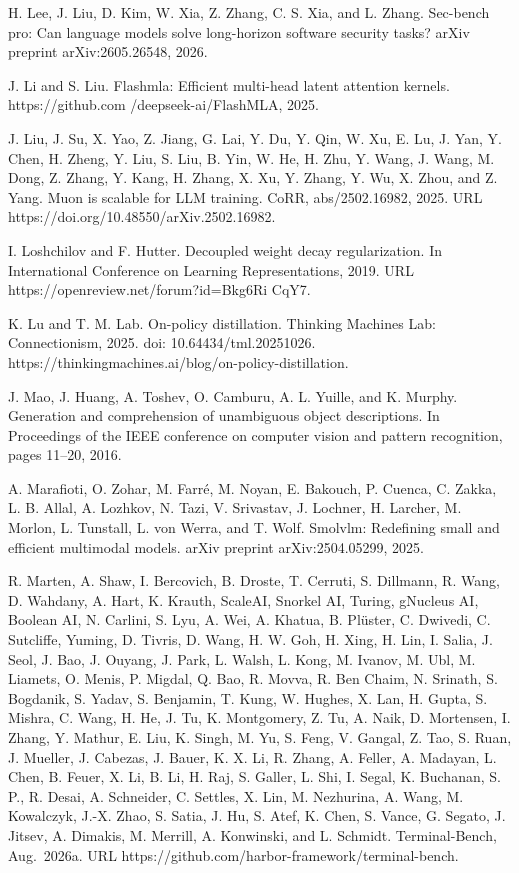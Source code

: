 \documentclass[
  10
]{article}
\begin{document}
H. Lee, J. Liu, D. Kim, W. Xia, Z. Zhang, C. S. Xia, and L. Zhang.
Sec-bench pro: Can language models solve long-horizon software security
tasks? arXiv preprint arXiv:2605.26548, 2026.

J. Li and S. Liu. Flashmla: Efficient multi-head latent attention
kernels. https://github.com /deepseek-ai/FlashMLA, 2025.

J. Liu, J. Su, X. Yao, Z. Jiang, G. Lai, Y. Du, Y. Qin, W. Xu, E. Lu, J.
Yan, Y. Chen, H. Zheng, Y. Liu, S. Liu, B. Yin, W. He, H. Zhu, Y. Wang,
J. Wang, M. Dong, Z. Zhang, Y. Kang, H. Zhang, X. Xu, Y. Zhang, Y. Wu,
X. Zhou, and Z. Yang. Muon is scalable for LLM training. CoRR,
abs/2502.16982, 2025. URL https://doi.org/10.48550/arXiv.2502.16982.

I. Loshchilov and F. Hutter. Decoupled weight decay regularization. In
International Conference on Learning Representations, 2019. URL
https://openreview.net/forum?id=Bkg6Ri CqY7.

K. Lu and T. M. Lab. On-policy distillation. Thinking Machines Lab:
Connectionism, 2025. doi: 10.64434/tml.20251026.
https://thinkingmachines.ai/blog/on-policy-distillation.

J. Mao, J. Huang, A. Toshev, O. Camburu, A. L. Yuille, and K. Murphy.
Generation and comprehension of unambiguous object descriptions. In
Proceedings of the IEEE conference on computer vision and pattern
recognition, pages 11--20, 2016.

A. Marafioti, O. Zohar, M. Farré, M. Noyan, E. Bakouch, P. Cuenca, C.
Zakka, L. B. Allal, A. Lozhkov, N. Tazi, V. Srivastav, J. Lochner, H.
Larcher, M. Morlon, L. Tunstall, L. von Werra, and T. Wolf. Smolvlm:
Redefining small and efficient multimodal models. arXiv preprint
arXiv:2504.05299, 2025.

R. Marten, A. Shaw, I. Bercovich, B. Droste, T. Cerruti, S. Dillmann, R.
Wang, D. Wahdany, A. Hart, K. Krauth, ScaleAI, Snorkel AI, Turing,
gNucleus AI, Boolean AI, N. Carlini, S. Lyu, A. Wei, A. Khatua, B.
Plüster, C. Dwivedi, C. Sutcliffe, Yuming, D. Tivris, D. Wang, H. W.
Goh, H. Xing, H. Lin, I. Salia, J. Seol, J. Bao, J. Ouyang, J. Park, L.
Walsh, L. Kong, M. Ivanov, M. Ubl, M. Liamets, O. Menis, P. Migdal, Q.
Bao, R. Movva, R. Ben Chaim, N. Srinath, S. Bogdanik, S. Yadav, S.
Benjamin, T. Kung, W. Hughes, X. Lan, H. Gupta, S. Mishra, C. Wang, H.
He, J. Tu, K. Montgomery, Z. Tu, A. Naik, D. Mortensen, I. Zhang, Y.
Mathur, E. Liu, K. Singh, M. Yu, S. Feng, V. Gangal, Z. Tao, S. Ruan, J.
Mueller, J. Cabezas, J. Bauer, K. X. Li, R. Zhang, A. Feller, A.
Madayan, L. Chen, B. Feuer, X. Li, B. Li, H. Raj, S. Galler, L. Shi, I.
Segal, K. Buchanan, S. P., R. Desai, A. Schneider, C. Settles, X. Lin,
M. Nezhurina, A. Wang, M. Kowalczyk, J.-X. Zhao, S. Satia, J. Hu, S.
Atef, K. Chen, S. Vance, G. Segato, J. Jitsev, A. Dimakis, M. Merrill,
A. Konwinski, and L. Schmidt. Terminal-Bench, Aug.~2026a. URL
https://github.com/harbor-framework/terminal-bench.
\end{document}
